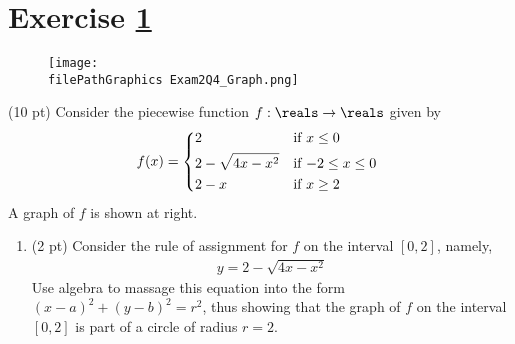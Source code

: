 




%
%
%
%


\newpage

\section{Exercise \ref{sec : Math112 Spring2022 MockExam2 Q4}}
\label{sec : Math112 Spring2022 MockExam2 Q4}

\begin{wrapfigure}{r}{0.35\textwidth}
\centering
\texttt{[image: \\filePathGraphics Exam2Q4\_Graph.png]}
\end{wrapfigure}
(10 pt) Consider the piecewise function $f : \reals \rightarrow \reals$ given by
\begin{align*}
f(x)
=
\begin{dcases*}
2				&	if $x \leq 0$		\\
2 - \sqrt{4 x - x^{2}}	&	if $-2 \leq x \leq 0$	\\
2 - x				&	if $x \geq 2$
\end{dcases*}
\end{align*}
A graph of $f$ is shown at right.



\begin{enumerate}[label=(\alph*)]
\item\label{itm : Exam2Q4a} (2 pt) Consider the rule of assignment for $f$ on the interval $[0,2]$, namely,
\begin{align*}
y
=
2 - \sqrt{4 x - x^{2}}
\end{align*}
Use algebra to massage this equation into the form $(x - a)^{2} + (y - b)^{2} = r^{2}$, thus showing that the graph of $f$ on the interval $[0,2]$ is part of a circle of radius $r = 2$.
\end{enumerate}

